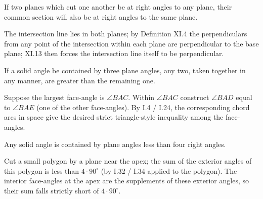 \begin{claim}
\label{prop:XI.19}
If two planes which cut one another be at right angles to any plane,
their common section will also be at right angles to the same plane.
\end{claim}
\begin{evidence}[Proof of XI.19]
\label{ev:XI.19}
The intersection line lies in both planes; by Definition XI.4 the
perpendiculars from any point of the intersection within each plane
are perpendicular to the base plane; XI.13 then forces the
intersection line itself to be perpendicular.
\end{evidence}

\begin{claim}
\label{prop:XI.20}
If a solid angle be contained by three plane angles, any two, taken
together in any manner, are greater than the remaining one.
\end{claim}
\begin{evidence}[Proof of XI.20]
\label{ev:XI.20}
Suppose the largest face-angle is $\angle BAC$.  Within $\angle BAC$
construct $\angle BAD$ equal to $\angle BAE$ (one of the other
face-angles).  By I.4 / I.24, the corresponding chord arcs in space
give the desired strict triangle-style inequality among the
face-angles.
\end{evidence}

\begin{claim}
\label{prop:XI.21}
Any solid angle is contained by plane angles less than four right
angles.
\end{claim}
\begin{evidence}[Proof of XI.21]
\label{ev:XI.21}
Cut a small polygon by a plane near the apex; the sum of the
exterior angles of this polygon is less than $4 \cdot 90^\circ$ (by
I.32 / I.34 applied to the polygon).  The interior face-angles at
the apex are the supplements of these exterior angles, so their sum
falls strictly short of $4 \cdot 90^\circ$.
\end{evidence}


